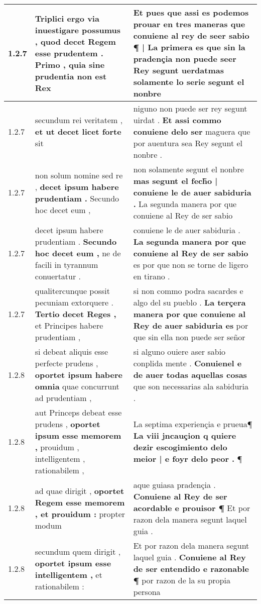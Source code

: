 \begin{tabular}{|p{1cm}|p{6.5cm}|p{6.5cm}|}
1.2.7 & Triplici ergo via inuestigare possumus , \textbf{ quod decet Regem esse prudentem . Primo , quia sine prudentia non est } Rex & Et pues que assi es podemos prouar en tres maneras \textbf{ que conuiene al rey de seer sabio ¶ | La primera es que sin la pradençia non puede seer Rey segunt } uerdatmas solamente lo serie segunt el nonbre \\\hline
1.2.7 & secundum rei veritatem , \textbf{ et ut decet licet forte } sit & niguno non puede ser rey segunt uirdat . \textbf{ Et assi commo conuiene delo ser } maguera que por auentura sea Rey segunt el nonbre . \\\hline
1.2.7 & non solum nomine sed re , \textbf{ decet ipsum habere prudentiam . } Secundo hoc decet eum , & non solamente segunt el nonbre \textbf{ mas segunt el fech̃o | conuiene le de auer sabiduria . } La segunda manera por que conuiene al Rey de ser sabio \\\hline
1.2.7 & decet ipsum habere prudentiam . \textbf{ Secundo hoc decet eum , } ne de facili in tyrannum conuertatur . & conuiene le de auer sabiduria . \textbf{ La segunda manera por que conuiene al Rey de ser sabio } es por que non se torne de ligero en tirano . \\\hline
1.2.7 & qualitercunque possit pecuniam extorquere . \textbf{ Tertio decet Reges , } et Principes habere prudentiam , & si non commo podra sacardes e algo del su pueblo . \textbf{ La terçera manera por que conuiene al Rey de auer sabiduria es } por que sin ella non puede ser señor \\\hline
1.2.8 & si debeat aliquis esse perfecte prudens , \textbf{ oportet ipsum habere omnia } quae concurrunt ad prudentiam , & si alguno ouiere aser sabio conplida mente . \textbf{ Conuienel e de auer todas aquellas cosas } que son necessarias ala sabiduria . \\\hline
1.2.8 & aut Princeps debeat esse prudens , \textbf{ oportet ipsum esse memorem , } prouidum , intelligentem , rationabilem , & La septima experiençia e prueua¶ \textbf{ La viii jncauçion q quiere dezir escogimiento delo meior | e foyr delo peor . } ¶ \\\hline
1.2.8 & ad quae dirigit , \textbf{ oportet Regem esse memorem , et prouidum : } propter modum & aque guiasa pradençia . \textbf{ Conuiene al Rey de ser acordable e prouisor ¶ } Et por razon dela manera segunt laquel guia . \\\hline
1.2.8 & secundum quem dirigit , \textbf{ oportet ipsum esse intelligentem , } et rationabilem : & Et por razon dela manera segunt laquel guia . \textbf{ Conuiene al Rey de ser entendido e razonable ¶ } por razon de la su propia persona \\\hline

\end{tabular}
